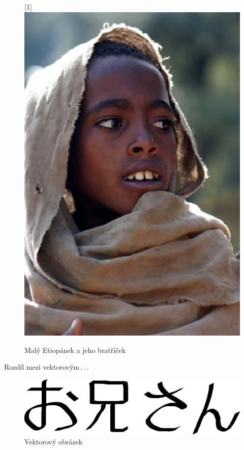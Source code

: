 \documentclass[a4paper, 11pt]{article}
\begin{document}
\begin{figure}[h]
    \scalebox{-1}[1]{\includegraphics[scale=0.4]{etiopan.eps}}
    \caption{Malý Etiopánek a jeho bratříček}
    \label{fig:etiopanek}
\end{figure}

\pagebreak

Rozdíl mezi vektorovým\,.\,.\,.
\begin{figure}[h]
    \centering
    \includegraphics[scale=0.4]{oniisan.eps}
    \caption{Vektorový obrázek}
    \label{fig:vektor}
\end{figure}
\end{document}
